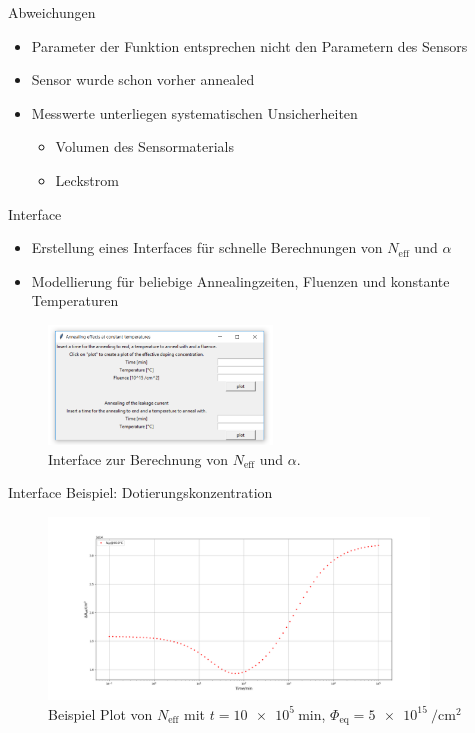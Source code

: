 \documentclass[aspectratio=1610, 9pt]{beamer}
\begin{document}
\begin{frame}{Abweichungen}
  \begin{itemize}
    \item Parameter der Funktion entsprechen nicht den Parametern des Sensors
    \medskip
    \item Sensor wurde schon vorher annealed
    \medskip
    \item Messwerte unterliegen systematischen Unsicherheiten
    \medskip
    \begin{itemize}
      \item Volumen des Sensormaterials
      \medskip
      \item Leckstrom
    \end{itemize}
  \end{itemize}
\end{frame}

\begin{frame}{Interface}
  \begin{itemize}
    \item Erstellung eines Interfaces für schnelle Berechnungen von $N_{\mathrm{eff}}$ und $\alpha$
    \item Modellierung für beliebige Annealingzeiten, Fluenzen und konstante Temperaturen
  \end{itemize}
  \begin{figure}
      \includegraphics[width=0.53\textwidth]{images/interface.PNG}
  \caption{Interface zur Berechnung von $N_{\mathrm{eff}}$ und $\alpha$.}
  \end{figure}
\end{frame}

\begin{frame}{Interface Beispiel: Dotierungskonzentration}
  \begin{figure}
    \includegraphics[width=0.9\textwidth]{images/interface_n_eff.PNG}
    \caption{Beispiel Plot von $N_{\mathrm{eff}}$ mit $t = \SI{10e5}{\minute}$, $\Phi_{\mathrm{eq}}= \SI{5e15}{\per\centi\meter\squared}$}
  \end{figure}
\end{frame}
\end{document}
